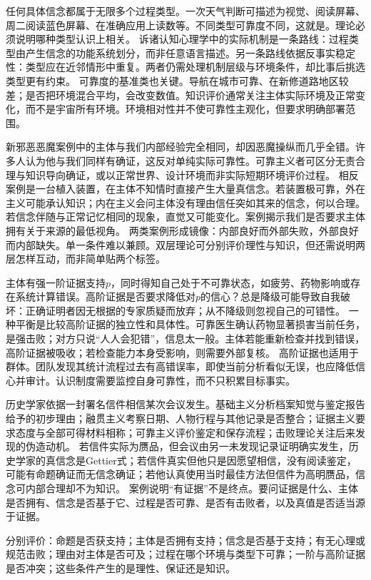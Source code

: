 任何具体信念都属于无限多个过程类型。一次天气判断可描述为视觉、阅读屏幕、周二阅读蓝色屏幕、在准确应用上读数等。不同类型可靠度不同，这就是。理论必须说明哪种类型认识上相关。 诉诸认知心理学中的实际机制是一条路线：过程类型由产生信念的功能系统划分，而非任意语言描述。另一条路线依据反事实稳定性：类型应在近邻情形中重复。两者仍需处理机制层级与环境条件，却比事后挑选类型更有约束。 可靠度的基准类也关键。导航在城市可靠、在新修道路地区较差；是否把环境混合平均，会改变数值。知识评价通常关注主体实际环境及正常变化，而不是宇宙所有环境。环境相对性并不使可靠性主观化，但要求明确部署范围。

新邪恶恶魔案例中的主体与我们内部经验完全相同，却因恶魔操纵而几乎全错。许多人认为他与我们同样有确证，这反对单纯实际可靠性。可靠主义者可区分无责合理与知识导向确证，或以正常世界、设计环境而非实际短期环境评价过程。 相反案例是一台植入装置，在主体不知情时直接产生大量真信念。若装置极可靠，外在主义可能承认知识；内在主义会问主体没有理由信任突如其来的信念，何以合理。若信念伴随与正常记忆相同的现象，直觉又可能变化。案例揭示我们是否要求主体拥有关于来源的最低视角。 两类案例形成镜像：内部良好而外部失败，外部良好而内部缺失。单一条件难以兼顾。双层理论可分别评价理性与知识，但还需说明两层怎样互动，而非简单贴两个标签。

主体有强一阶证据支持$p$，同时得知自己处于不可靠状态，如疲劳、药物影响或存在系统计算错误。高阶证据是否要求降低对$p$的信心？总是降级可能导致自我破坏：正确证明者因无根据的专家质疑而放弃；从不降级则忽视自己的可错性。 一种平衡是比较高阶证据的独立性和具体性。可靠医生确认药物显著损害当前任务，是强击败；对方只说“人人会犯错”，信息太一般。主体若能重新检查并找到错误，高阶证据被吸收；若检查能力本身受影响，则需要外部复核。 高阶证据也适用于群体。团队发现其统计流程过去有高错误率，即使当前分析看似无误，也应降低信心并审计。认识制度需要监控自身可靠性，而不只积累目标事实。

历史学家依据一封署名信件相信某次会议发生。基础主义分析档案知觉与鉴定报告给予的初步理由；融贯主义考察日期、人物行程与其他记录是否整合；证据主义要求态度与全部可得材料相称；可靠主义评价鉴定和保存流程；击败理论关注后来发现的伪造动机。 若信件实际为赝品，但会议由另一未发现记录证明确实发生，历史学家的真信念是Gettier式；若信件真实但他只是因愿望相信，没有阅读鉴定，可能有命题确证而无信念确证；若他认真使用当时最佳方法但信件为高明赝品，信念可内部合理却不为知识。 案例说明“有证据”不是终点。要问证据是什么、主体是否拥有、信念是否基于它、过程是否可靠、是否有击败者，以及真值是否适当源于证据。

\begin{tcolorbox}[breakable,colback=white,colframe=blue!30!black,title={确证诊断表},fonttitle=\bfseries]
分别评价：命题是否获支持；主体是否拥有支持；信念是否基于支持；有无心理或规范击败；理由对主体是否可及；过程在哪个环境与类型下可靠；一阶与高阶证据是否冲突；这些条件产生的是理性、保证还是知识。
\end{tcolorbox}
